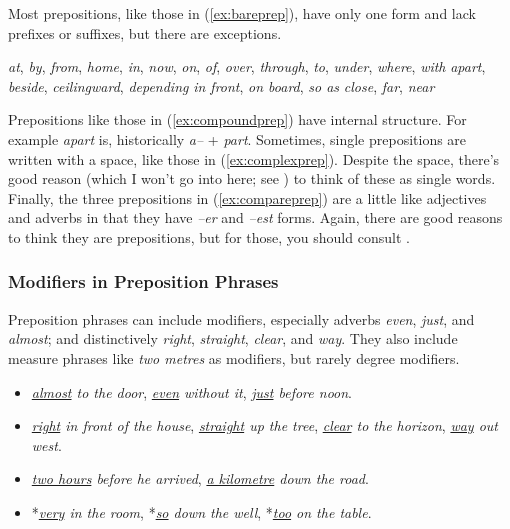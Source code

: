 Most prepositions, like those in (\ref{ex:bareprep}), have only one form and lack prefixes or suffixes, but there are exceptions.

\ea 
   \ea \textit{at}, \textit{by}, \textit{from}, \textit{home}, \textit{in}, \textit{now}, \textit{on}, \textit{of}, \textit{over}, \textit{through}, \textit{to}, \textit{under}, \textit{where}, \textit{with} \label{ex:bareprep}
   \ex \textit{apart}, \textit{beside}, \textit{ceilingward}, \textit{depending} \label{ex:compoundprep}
   \ex \textit{in front}, \textit{on board}, \textit{so as} \label{ex:complexprep}
   \ex \textit{close}, \textit{far}, \textit{near} \label{ex:compareprep}
   \z
\z

\noindent Prepositions like those in (\ref{ex:compoundprep}) have internal structure. For example \textit{apart} is, historically \textit{a--} + \textit{part}. Sometimes, single prepositions are written with a space, like those in (\ref{ex:complexprep}). Despite the space, there's good reason (which I won't go into here; see \cite[622]{Huddleston2002}) to think of these as single words. Finally, the three prepositions in (\ref{ex:compareprep}) are a little like adjectives and adverbs in that they have \textit{--er} and \textit{--est} forms. Again, there are good reasons to think they are prepositions, but for those, you should consult \textcite[609]{Huddleston2002}.

\subsubsection*{Modifiers in Preposition Phrases}

Preposition phrases can include modifiers, especially adverbs \textit{even}, \textit{just}, and \textit{almost}; and distinctively \textit{right}, \textit{straight}, \textit{clear}, and \textit{way}. They also include measure phrases like \textit{two metres} as modifiers, but rarely degree modifiers.

\begin{itemize}
   \item \textit{\uline{almost} to the door}, \textit{\uline{even} without it},  \textit{\uline{just} before noon}.
   \item \textit{\uline{right} in front of the house}, \textit{\uline{straight} up the tree}, \textit{\uline{clear} to the horizon}, \textit{\uline{way} out west}.
   \item \textit{\uline{two hours} before he arrived}, \textit{\uline{a kilometre} down the road}.
   \item *\textit{\uline{very} in the room}, *\textit{\uline{so} down the well}, *\textit{\uline{too} on the table}.
\end{itemize}

